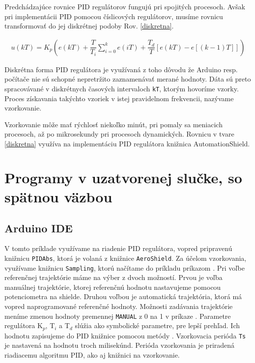 Predchádzajúce rovnice PID regulátorov fungujú pri spojitých procesoch. Avšak pri implementácii PID pomocou číslicových regulátorov, musíme rovnicu transformovať do jej diskrétnej podoby Rov. \ref{diskretna}.

\begin{align}
	\label{diskretna}
	u(kT)=K_p \left(e(kT) + \dfrac{T}{T_i} \sum_{i=0}^{k}  e(iT) + \dfrac{T_d}{T} \left[e(kT)-e \left[(k - 1)T\right] \right] \right)
\end{align}

Diskrétna forma PID regulátora je využívaná z toho dôvodu že Arduino resp. počítače nie sú schopné nepretržito zaznamenávať merané hodnoty. Dáta sú preto spracovávané v diskrétnych časových intervaloch \verb|kT|, ktorým hovoríme vzorky. Proces získavania takýchto vzoriek v istej pravidelnom frekvencii, nazývame vzorkovanie. 

Vzorkovanie môže mať rýchlosť niekoľko minút, pri pomaly sa meniacich procesoch, až po mikrosekundy pri procesoch dynamických. Rovnicu v tvare \ref{diskretna} využíva na implementáciu PID regulátora knižnica AutomationShield. 

\section{Programy v uzatvorenej slučke, so spätnou väzbou}
\subsection{Arduino IDE}
\label{sospatnou}
\label{Arduino IDE PID}

V tomto príklade využívame na riadenie PID regulátora, vopred pripravenú knižnicu \verb|PIDAbs|, ktorá je volaná z knižnice \verb|AeroShield|. Za účelom vzorkovania, využívame knižnicu \verb|Sampling|, ktorú načítame do príkladu príkazom . Pri voľbe referenčnej trajektórie máme na výber z dvoch možností. Prvou je voľba manuálnej trajektórie, ktorej referenčnú hodnotu nastavujeme pomocou potenciometra na shielde. Druhou voľbou je automatická trajektória, ktorá má vopred naprogramované referenčné hodnoty. Možnosti zadávania trajektórie meníme zmenou hodnoty premennej \verb|MANUAL| z 0 na 1 v príkaze . Parametre regulátora K$_p$, T$_i$ a T$_d$ slúžia ako symbolické parametre, pre lepší prehľad. Ich hodnotu zapisujeme do PID knižnice pomocou metódy . Vzorkovacia perióda \verb|Ts| je nastavená na hodnotu troch milisekúnd. Perióda vzorkovania je priradená riadiacemu algoritmu PID, ako aj knižnici na vzorkovanie. 

